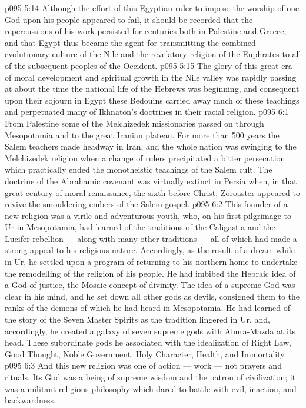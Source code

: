 \vs p095 5:14 \pc Although the effort of this Egyptian ruler to impose the worship of one God upon his people appeared to fail, it should be recorded that the repercussions of his work persisted for centuries both in Palestine and Greece, and that Egypt thus became the agent for transmitting the combined evolutionary culture of the Nile and the revelatory religion of the Euphrates to all of the subsequent peoples of the Occident.
\vs p095 5:15 The glory of this great era of moral development and spiritual growth in the Nile valley was rapidly passing at about the time the national life of the Hebrews was beginning, and consequent upon their sojourn in Egypt these Bedouins carried away much of these teachings and perpetuated many of Ikhnaton’s doctrines in their racial religion.
\vs p095 6:1 From Palestine some of the Melchizedek missionaries passed on through Mesopotamia and to the great Iranian plateau. For more than 500 years the Salem teachers made headway in Iran, and the whole nation was swinging to the Melchizedek religion when a change of rulers precipitated a bitter persecution which practically ended the monotheistic teachings of the Salem cult. The doctrine of the Abrahamic covenant was virtually extinct in Persia when, in that great century of moral renaissance, the sixth before Christ, Zoroaster appeared to revive the smouldering embers of the Salem gospel.
\vs p095 6:2 This founder of a new religion was a virile and adventurous youth, who, on his first pilgrimage to Ur in Mesopotamia, had learned of the traditions of the Caligastia and the Lucifer rebellion --- along with many other traditions --- all of which had made a strong appeal to his religious nature. Accordingly, as the result of a dream while in Ur, he settled upon a program of returning to his northern home to undertake the remodelling of the religion of his people. He had imbibed the Hebraic idea of a God of justice, the Mosaic concept of divinity. The idea of a supreme God was clear in his mind, and he set down all other gods as devils, consigned them to the ranks of the demons of which he had heard in Mesopotamia. He had learned of the story of the Seven Master Spirits as the tradition lingered in Ur, and, accordingly, he created a galaxy of seven supreme gods with Ahura\hyp{}Mazda at its head. These subordinate gods he associated with the idealization of Right Law, Good Thought, Noble Government, Holy Character, Health, and Immortality.
\vs p095 6:3 And this new religion was one of action --- work --- not prayers and rituals. Its God was a being of supreme wisdom and the patron of civilization; it was a militant religious philosophy which dared to battle with evil, inaction, and backwardness.
